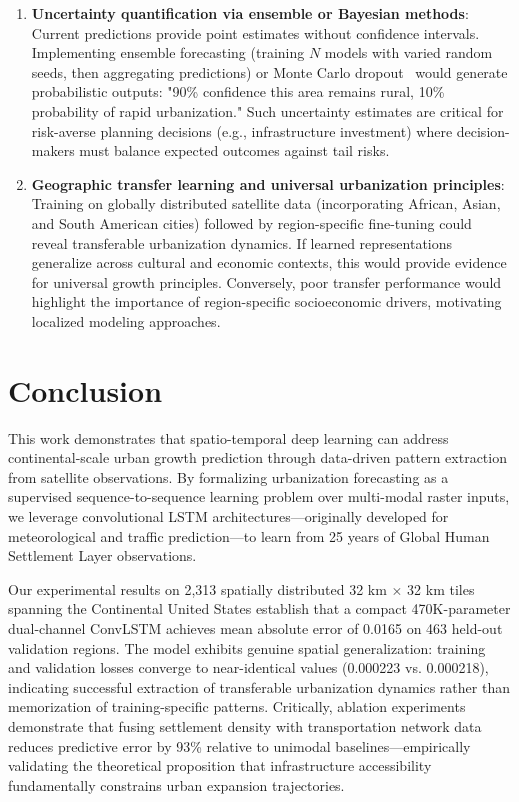 \documentclass[conference]{IEEEtran}
\begin{document}
\begin{enumerate}
    \item \textbf{Uncertainty quantification via ensemble or Bayesian methods}: Current predictions provide point estimates without confidence intervals. Implementing ensemble forecasting (training $N$ models with varied random seeds, then aggregating predictions) or Monte Carlo dropout~\cite{gal2016} would generate probabilistic outputs: "90\% confidence this area remains rural, 10\% probability of rapid urbanization." Such uncertainty estimates are critical for risk-averse planning decisions (e.g., infrastructure investment) where decision-makers must balance expected outcomes against tail risks.
    
    \item \textbf{Geographic transfer learning and universal urbanization principles}: Training on globally distributed satellite data (incorporating African, Asian, and South American cities) followed by region-specific fine-tuning could reveal transferable urbanization dynamics. If learned representations generalize across cultural and economic contexts, this would provide evidence for universal growth principles. Conversely, poor transfer performance would highlight the importance of region-specific socioeconomic drivers, motivating localized modeling approaches.
\end{enumerate}

\section{Conclusion}
This work demonstrates that spatio-temporal deep learning can address continental-scale urban growth prediction through data-driven pattern extraction from satellite observations. By formalizing urbanization forecasting as a supervised sequence-to-sequence learning problem over multi-modal raster inputs, we leverage convolutional LSTM architectures---originally developed for meteorological and traffic prediction---to learn from 25 years of Global Human Settlement Layer observations.

Our experimental results on 2,313 spatially distributed 32 km $\times$ 32 km tiles spanning the Continental United States establish that a compact 470K-parameter dual-channel ConvLSTM achieves mean absolute error of 0.0165 on 463 held-out validation regions. The model exhibits genuine spatial generalization: training and validation losses converge to near-identical values (0.000223 vs. 0.000218), indicating successful extraction of transferable urbanization dynamics rather than memorization of training-specific patterns. Critically, ablation experiments demonstrate that fusing settlement density with transportation network data reduces predictive error by 93\% relative to unimodal baselines---empirically validating the theoretical proposition that infrastructure accessibility fundamentally constrains urban expansion trajectories.
\end{document}
